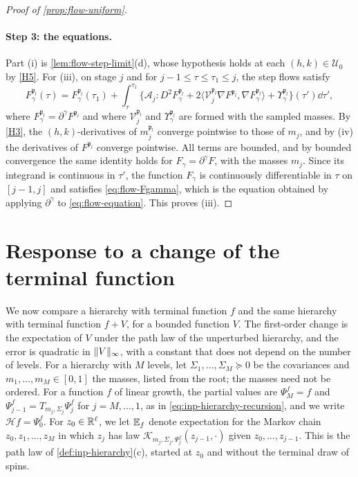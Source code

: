 \begin{proof}[Proof of \cref{prop:flow-uniform}]
\paragraph{Step 3: the equations.} Part (i) is \cref{lem:flow-step-limit}(d),
whose hypothesis holds at each $(h,k)\in\mathcal U_0$ by \ref{H5}. For (iii), on
stage $j$ and for $j-1\le\tau\le\tau_1\le j$, the step flows satisfy
\[
 F^{\mathfrak p_l}_\gamma(\tau)=F^{\mathfrak p_l}_\gamma(\tau_1)+\int_\tau^{\tau_1}
 \bigl\{\mathcal A_j\mathbin{:}D^2F^{\mathfrak p_l}_\gamma
 +2\langle\mathcal V_j^{\mathfrak p_l}\nabla F^{\mathfrak p_l},\nabla F^{\mathfrak p_l}_\gamma\rangle
 +\Upsilon^{\mathfrak p_l}_\gamma\bigr\}(\tau')\dd\tau',
\]
where $F^{\mathfrak p_l}_\gamma=\partial^\gamma F^{\mathfrak p_l}$ and where $\mathcal V_j^{\mathfrak p_l}$ and
$\Upsilon^{\mathfrak p_l}_\gamma$ are formed with the sampled masses. By \ref{H3}, the
$(h,k)$-derivatives of $m_j^{\mathfrak p_l}$ converge pointwise to those of $m_j$,
and by (iv) the derivatives of $F^{\mathfrak p_l}$ converge pointwise. All terms are bounded,
and by bounded convergence the same identity holds for $F_\gamma=\partial^\gamma F$,
with the masses $m_j$. Since its integrand is continuous in $\tau'$, the function
$F_\gamma$ is continuously differentiable in $\tau$ on $[j-1,j]$ and satisfies
\eqref{eq:flow-Fgamma}, which is the equation obtained by applying $\partial^\gamma$
to \eqref{eq:flow-equation}. This proves (iii).
\end{proof}

\section{Response to a change of the terminal function}\label{sec:flow-response}

We now compare a hierarchy with terminal function $f$ and the same hierarchy with
terminal function $f+V$, for a bounded function $V$. The first-order change is
the expectation of $V$ under the path law of the unperturbed hierarchy, and the
error is quadratic in $\lVert V\rVert_\infty$, with a constant that does not depend on
the number of levels. For a hierarchy with $M$ levels, let $\Sigma_1,\dots,\Sigma_M
\succeq0$ be the covariances and $m_1,\dots,m_M\in[0,1]$ the masses, listed from
the root; the masses need not be ordered. For a function $f$ of linear growth, the
partial values are $\Psi^f_M=f$ and $\Psi^f_{j-1}=T_{m_j,\Sigma_j}\Psi^f_j$ for
$j=M,\dots,1$, as in \eqref{eq:inp-hierarchy-recursion}, and we write
$\mathcal Hf=\Psi_0^f$. For $z_0\in\mathbb R^\ell$, we let $\mathbb E_f$ denote expectation for
the Markov chain $z_0,z_1,\dots,z_M$ in which $z_j$ has law
$\mathcal K_{m_j,\Sigma_j,\Psi^f_j}(z_{j-1},\cdot)$ given $z_0,\dots,z_{j-1}$.
This is the path law of \cref{def:inp-hierarchy}(c), started at $z_0$ and without
the terminal draw of spins.


